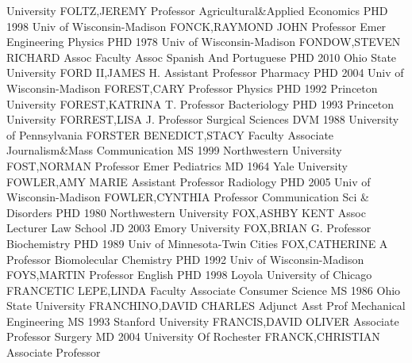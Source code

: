 \documentclass[
]{article}
\begin{document}
University \textbar{}  \textbar FOLTZ,JEREMY
\textbar Professor \textbar Agricultural\&Applied Economics \textbar PHD
1998 Univ of Wisconsin-Madison \textbar{} 
\textbar FONCK,RAYMOND JOHN \textbar Professor Emer \textbar Engineering
Physics \textbar PHD 1978 Univ of Wisconsin-Madison \textbar{}
 \textbar FONDOW,STEVEN RICHARD \textbar Assoc Faculty Assoc
\textbar Spanish And Portuguese \textbar PHD 2010 Ohio State University
\textbar{}  \textbar FORD II,JAMES H. \textbar Assistant
Professor \textbar Pharmacy \textbar PHD 2004 Univ of Wisconsin-Madison
\textbar{}  \textbar FOREST,CARY \textbar Professor
\textbar Physics \textbar PHD 1992 Princeton University \textbar{}
 \textbar FOREST,KATRINA T. \textbar Professor
\textbar Bacteriology \textbar PHD 1993 Princeton University \textbar{}
 \textbar FORREST,LISA J. \textbar Professor
\textbar Surgical Sciences \textbar DVM 1988 University of Pennsylvania
\textbar{}  \textbar FORSTER BENEDICT,STACY \textbar Faculty
Associate \textbar Journalism\&Mass Communication \textbar MS 1999
Northwestern University \textbar{}  \textbar FOST,NORMAN
\textbar Professor Emer \textbar Pediatrics \textbar MD 1964 Yale
University \textbar{}  \textbar FOWLER,AMY MARIE
\textbar Assistant Professor \textbar Radiology \textbar PHD 2005 Univ
of Wisconsin-Madison \textbar{}  \textbar FOWLER,CYNTHIA
\textbar Professor \textbar Communication Sci \& Disorders \textbar PHD
1980 Northwestern University \textbar{}  \textbar FOX,ASHBY
KENT \textbar Assoc Lecturer \textbar Law School \textbar JD 2003 Emory
University \textbar{}  \textbar FOX,BRIAN G.
\textbar Professor \textbar Biochemistry \textbar PHD 1989 Univ of
Minnesota-Twin Cities \textbar{}  \textbar FOX,CATHERINE A
\textbar Professor \textbar Biomolecular Chemistry \textbar PHD 1992
Univ of Wisconsin-Madison \textbar{}  \textbar FOYS,MARTIN
\textbar Professor \textbar English \textbar PHD 1998 Loyola University
of Chicago \textbar{}  \textbar FRANCETIC LEPE,LINDA
\textbar Faculty Associate \textbar Consumer Science \textbar MS 1986
Ohio State University \textbar{}  \textbar FRANCHINO,DAVID
CHARLES \textbar Adjunct Asst Prof \textbar Mechanical Engineering
\textbar MS 1993 Stanford University \textbar{} 
\textbar FRANCIS,DAVID OLIVER \textbar Associate Professor
\textbar Surgery \textbar MD 2004 University Of Rochester \textbar{}
 \textbar FRANCK,CHRISTIAN \textbar Associate Professor
\end{document}
